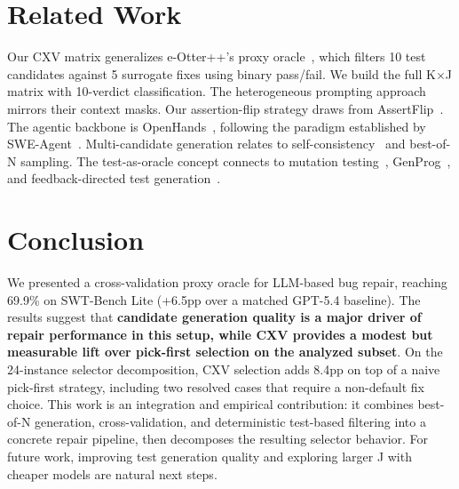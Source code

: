 \documentclass{article}
\begin{document}
\FloatBarrier

\section{Related Work}

Our CXV matrix generalizes e-Otter++'s proxy oracle~\cite{chen2024e}, which filters 10 test candidates against 5 surrogate fixes using binary pass/fail. We build the full K$\times$J matrix with 10-verdict classification. The heterogeneous prompting approach mirrors their context masks. Our assertion-flip strategy draws from AssertFlip~\cite{mundler2024assertflip}. The agentic backbone is OpenHands~\cite{wang2024openhands}, following the paradigm established by SWE-Agent~\cite{yang2024sweagent}. Multi-candidate generation relates to self-consistency~\cite{wang2023selfconsistency} and best-of-N sampling. The test-as-oracle concept connects to mutation testing~\cite{demillo1978hints}, GenProg~\cite{le2012genetic}, and feedback-directed test generation~\cite{pacheco2007feedback}.

\section{Conclusion}

We presented a cross-validation proxy oracle for LLM-based bug repair, reaching 69.9\% on SWT-Bench Lite (+6.5pp over a matched GPT-5.4 baseline). The results suggest that \textbf{candidate generation quality is a major driver of repair performance in this setup, while CXV provides a modest but measurable lift over pick-first selection on the analyzed subset}. On the 24-instance selector decomposition, CXV selection adds 8.4pp on top of a naive pick-first strategy, including two resolved cases that require a non-default fix choice. This work is an integration and empirical contribution: it combines best-of-N generation, cross-validation, and deterministic test-based filtering into a concrete repair pipeline, then decomposes the resulting selector behavior. For future work, improving test generation quality and exploring larger J with cheaper models are natural next steps.



\end{document}
